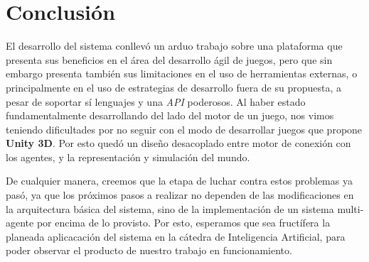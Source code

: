 \documentclass[a4paper,oneside]{article}
\begin{document}
\section{Conclusión}

El desarrollo del sistema conllevó un arduo trabajo sobre una plataforma que
presenta sus beneficios en el área del desarrollo ágil de juegos, pero que sin
embargo presenta también sus limitaciones en el uso de herramientas externas,
o principalmente en el uso de estrategias de desarrollo fuera de su propuesta,
a pesar de soportar sí lenguajes y una \textit{API} poderosos. Al haber estado
fundamentalmente desarrollando del lado del motor de un juego, nos vimos
teniendo dificultades por no seguir con el modo de desarrollar juegos que
propone \textbf{Unity 3D}. Por esto quedó un diseño desacoplado entre motor de
conexión con los agentes, y la representación y simulación del mundo.

De cualquier manera, creemos que la etapa de luchar contra estos problemas ya
pasó, ya que los próximos pasos a realizar no dependen de las modificaciones en
la arquitectura básica del sistema, sino de la implementación de un sistema
multi-agente por encima de lo provisto. Por esto, esperamos que sea fructífera
la planeada aplicacación del sistema en la cátedra de Inteligencia Artificial,
para poder observar el producto de nuestro trabajo en funcionamiento.
\end{document}
